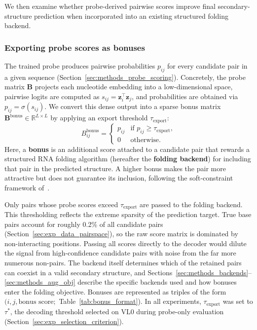 \documentclass[logo,bsc,singlespacing,parskip]{infthesis}
\begin{document}
We then examine whether probe-derived pairwise scores improve final secondary-structure prediction when incorporated into an existing structured folding backend. 

\subsubsection{Exporting probe scores as bonuses}
\label{sec:methods_bonus_export}
The trained probe produces pairwise probabilities \(p_{ij}\) for every
candidate pair in a given sequence
(Section~\ref{sec:methods_probe_scoring}). Concretely, the probe matrix
\(\mathbf{B}\) projects each nucleotide embedding into a
low-dimensional space, pairwise logits are computed as
\(s_{ij} = \mathbf{z}_i^\top \mathbf{z}_j\), and probabilities are
obtained via \(p_{ij} = \sigma(s_{ij})\). We convert this dense output
into a sparse bonus matrix
\(\mathbf{B}^{\mathrm{bonus}} \in \mathbb{R}^{L \times L}\) by
applying an export threshold \(\tau_{\mathrm{export}}\):
\begin{equation}
B^{\mathrm{bonus}}_{ij} =
\begin{cases}
p_{ij} & \text{if } p_{ij} \ge \tau_{\mathrm{export}},\\
0      & \text{otherwise}.
\end{cases}
\end{equation}
Here, a \textbf{bonus} is an additional score attached to a candidate
pair that rewards a structured RNA folding algorithm (hereafter the
\textbf{folding backend}) for including that pair in the predicted
structure. A higher bonus makes the pair more attractive but does not
guarantee its inclusion, following the soft-constraint framework
of~\citep{washietl2012softconstraints}.

Only pairs whose probe scores exceed $\tau_{\mathrm{export}}$ are
passed to the folding backend. This thresholding reflects the extreme sparsity
of the prediction target. True base pairs account for roughly 0.2\%
of all candidate pairs (Section~\ref{sec:exp_data_pairspace}), so the
raw score matrix is dominated by non-interacting positions. Passing all scores directly to the decoder would dilute the signal from high-confidence candidate pairs with noise from the far more numerous non-pairs. 
The backend itself determines which of the retained pairs can coexist in a valid secondary structure, and Sections~\ref{sec:methods_backends}--\ref{sec:methods_aug_obj} describe the specific backends used and how bonuses enter the folding objective. Bonuses are represented as triples of the form $(i, j, \text{bonus score};$ Table~\ref{tab:bonus_format}).
In all experiments, \(\tau_{\mathrm{export}}\) was set to \(\tau^\ast\), the decoding threshold selected on VL0 during probe-only evaluation (Section~\ref{sec:exp_selection_criterion}).
\end{document}
